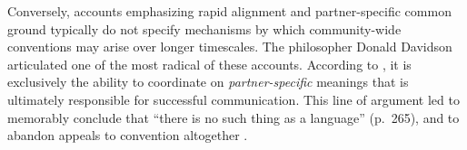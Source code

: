 Conversely, accounts emphasizing rapid alignment \cite{pickering2004toward} and partner-specific common ground \cite{ClarkWilkesGibbs86_ReferringCollaborative} typically do not specify mechanisms by which community-wide conventions may arise over longer timescales.
The philosopher Donald Davidson articulated one of the most radical of these accounts.
According to , it is exclusively the ability to coordinate on \emph{partner-specific} meanings that is ultimately responsible for successful communication.
This line of argument led  to memorably conclude that ``there is no such thing as a language'' (p.~265), and to abandon appeals to convention altogether \cite<see also>[for discussion]{heck_idiolect,lepore2007reality,hacking1986nice,dummett1994}.%

